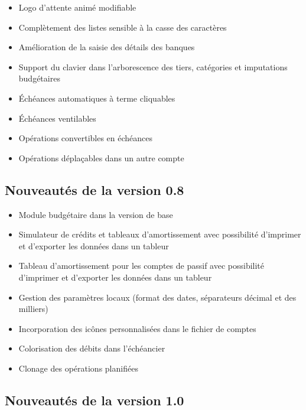 \begin{itemize}
	\item Logo d'attente animé modifiable
	\item Complètement des listes sensible à la casse des caractères
	\item Amélioration de la saisie des détails des banques
	\item Support du clavier dans l'arborescence des tiers, catégories et imputations budgétaires
	\item Échéances automatiques à terme cliquables
	\item Échéances ventilables
	\item Opérations convertibles en échéances
	\item Opérations déplaçables dans un autre compte
\end{itemize}


\subsection{Nouveautés de la version 0.8}

\begin{itemize}
	\item Module budgétaire dans la version de base
	\item Simulateur de crédits et tableaux d'amortissement avec possibilité d'imprimer et d'exporter les données dans un tableur
	\item Tableau d'amortissement pour les comptes de passif avec possibilité d'imprimer et d'exporter les données dans un tableur
	\item Gestion des paramètres locaux (format des dates, séparateurs décimal et des milliers)
	\item Incorporation des icônes personnalisées dans le fichier de comptes
	\item Colorisation des débits dans l'échéancier
	\item Clonage des opérations planifiées
\end{itemize}


\subsection{Nouveautés de la version 1.0}

